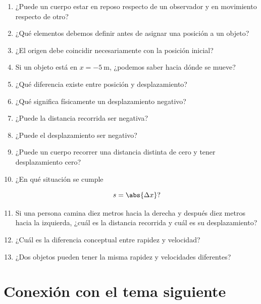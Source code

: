 \begin{enumerate}

    \item ¿Puede un cuerpo estar en reposo respecto de un observador y en
    movimiento respecto de otro?

    \item ¿Qué elementos debemos definir antes de asignar una posición a un
    objeto?

    \item ¿El origen debe coincidir necesariamente con la posición inicial?

    \item Si un objeto está en \(x=-\SI{5}{\meter}\), ¿podemos saber hacia
    dónde se mueve?

    \item ¿Qué diferencia existe entre posición y desplazamiento?

    \item ¿Qué significa físicamente un desplazamiento negativo?

    \item ¿Puede la distancia recorrida ser negativa?

    \item ¿Puede el desplazamiento ser negativo?

    \item ¿Puede un cuerpo recorrer una distancia distinta de cero y tener
    desplazamiento cero?

    \item ¿En qué situación se cumple

    \[
    s=\abs{\Delta x}?
    \]

    \item Si una persona camina diez metros hacia la derecha y después diez
    metros hacia la izquierda, ¿cuál es la distancia recorrida y cuál es su
    desplazamiento?

    \item ¿Cuál es la diferencia conceptual entre rapidez y velocidad?

    \item ¿Dos objetos pueden tener la misma rapidez y velocidades
    diferentes?

\end{enumerate}


\section{Conexión con el tema siguiente}

